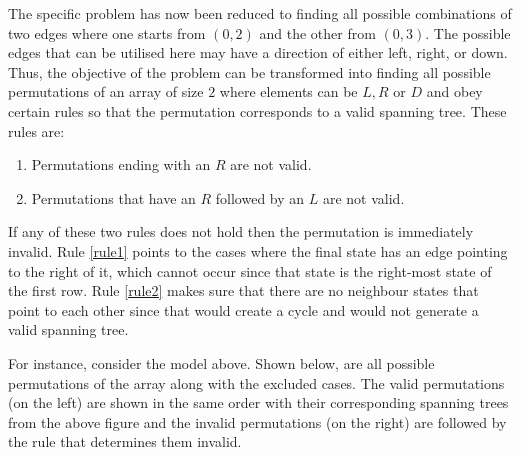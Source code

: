 \begin{figure}[h]
    \centering
\end{figure}

The specific problem has now been reduced to finding all possible combinations of two edges where one starts from \((0,2)\) and the other from \((0,3)\). 
The possible edges that can be utilised here may have a direction of either left, right, or down. 
Thus, the objective of the problem can be transformed into finding all possible permutations of an array of size \(2\) where elements can be \(L, R \text{ or } D\) and obey certain rules so that the permutation corresponds to a valid spanning tree. These rules are:

\begin{enumerate}
    \item Permutations ending with an \(R\) are not valid. \label{rule1}
    \item Permutations that have an \(R\) followed by an \(L\) are not valid. \label{rule2}
\end{enumerate}

If any of these two rules does not hold then the permutation is immediately invalid. 
Rule \ref{rule1} points to the cases where the final state has an edge pointing to the right of it, which cannot occur since that state is the right-most state of the first row. 
Rule \ref{rule2} makes sure that there are no neighbour states that point to each other since that would create a cycle and would not generate a valid spanning tree.

For instance, consider the model above. 
Shown below, are all possible permutations of the array along with the excluded cases. 
The valid permutations (on the left) are shown in the same order with their corresponding spanning trees from the above figure and the invalid permutations (on the right) are followed by the rule that determines them invalid.

